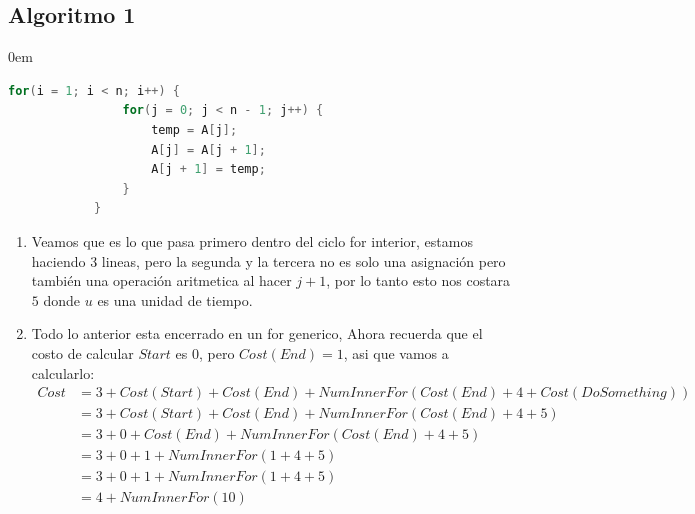 \documentclass[12pt, fleqn]{article}                            %
\newenvironment{SmallIndentation}[1][0.75em]                    %
        {\begin{adjustwidth}{#1}{}\begin{footnotesize}}             %
        {\end{footnotesize}\end{adjustwidth}}                       %
\theoremstyle{break}                                            %
\begin{document}
    \subsection{Algoritmo 1}
    \begin{SmallIndentation}[0em]
            
        \begin{lstlisting}[language=C, gobble=12, basicstyle=\small\color{white}]
            for(i = 1; i < n; i++) {
                for(j = 0; j < n - 1; j++) {
                    temp = A[j];                
                    A[j] = A[j + 1];            
                    A[j + 1] = temp;            
                }
            }
        \end{lstlisting}   



        \begin{enumerate}
            \item
                Veamos que es lo que pasa primero dentro del ciclo for interior, estamos haciendo 3 lineas,
                pero la segunda y la tercera no es solo una asignación pero también una operación aritmetica
                al hacer $j+1$, por lo tanto esto nos costara $5$ donde $u$ es una unidad de tiempo.


            \item Todo lo anterior esta encerrado en un for generico, 
                Ahora recuerda que el costo de calcular $Start$ es 0, pero $Cost(End) = 1$, 
                asi que vamos a calcularlo:
                \begin{align*}
                    Cost 
                        &= 3 + Cost(Start) + Cost(End) + NumInnerFor(Cost(End) + 4 + Cost(DoSomething))     \\
                        &= 3 + Cost(Start) + Cost(End) + NumInnerFor(Cost(End) + 4 + 5)                     \\
                        &= 3 + 0 + Cost(End) + NumInnerFor(Cost(End) + 4 + 5)                               \\
                        &= 3 + 0 + 1 + NumInnerFor(1 + 4 + 5)                                               \\
                        &= 3 + 0 + 1 + NumInnerFor(1 + 4 + 5)                                               \\
                        &= 4 + NumInnerFor(10)                                                             
                \end{align*}


\end{enumerate}
\end{SmallIndentation}
\end{document}
